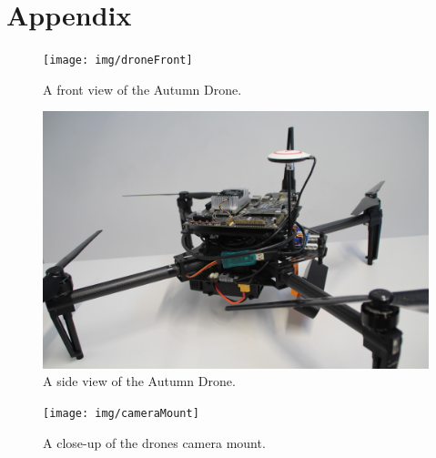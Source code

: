 \chapter*{Appendix}
\label{chapter:appendix}



\begin{figure}[!ht]
	\centering
	\texttt{[image: img/droneFront]}
	\caption{
		A front view of the Autumn Drone.
	}
	\label{fig:droneFront}
\end{figure}

\pagebreak

\begin{figure}[!ht]
	\centering
	\includegraphics[width=0.9\linewidth]{img/droneSide}
	\caption{
		A side view of the Autumn Drone.
	}
	\label{fig:droneSide}
\end{figure}

\pagebreak

\begin{figure}[!ht]
	\centering
	\texttt{[image: img/cameraMount]}
	\caption{
		A close-up of the drones camera mount.
	}
	\label{fig:cameraMount}
\end{figure}

\pagebreak







